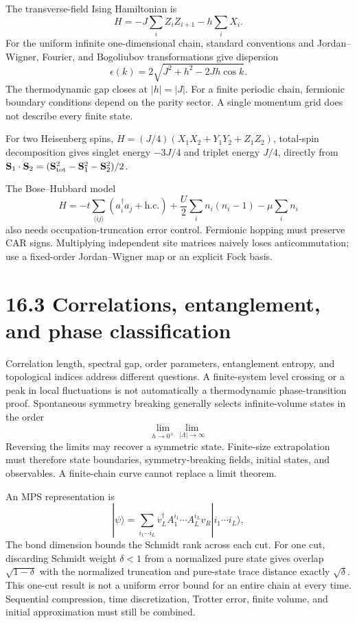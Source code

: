 \documentclass[
  11pt,
  oneside]{book}
\begin{document}
The transverse-field Ising Hamiltonian is \[
H=-J\sum_iZ_iZ_{i+1}-h\sum_iX_i.
\] For the uniform infinite one-dimensional chain, standard conventions
and Jordan--Wigner, Fourier, and Bogoliubov transformations give
dispersion \[
\epsilon(k)=2\sqrt{J^2+h^2-2Jh\cos k}.
\] The thermodynamic gap closes at \(|h|=|J|\). For a finite periodic
chain, fermionic boundary conditions depend on the parity sector. A
single momentum grid does not describe every finite state.

For two Heisenberg spins, \(H=(J/4)(X_1X_2+Y_1Y_2+Z_1Z_2)\), total-spin
decomposition gives singlet energy \(-3J/4\) and triplet energy \(J/4\),
directly from
\(\mathbf S_1\cdot\mathbf S_2=(\mathbf S_{\rm tot}^2-\mathbf S_1^2-\mathbf S_2^2)/2\).

The Bose--Hubbard model \[
H=-t\sum_{\langle ij\rangle}(a_i^\dagger a_j+\mathrm{h.c.})
+\frac U2\sum_i n_i(n_i-1)-\mu\sum_i n_i
\] also needs occupation-truncation error control. Fermionic hopping
must preserve CAR signs. Multiplying independent site matrices naively
loses anticommutation; use a fixed-order Jordan--Wigner map or an
explicit Fock basis.

\section{16.3 Correlations, entanglement, and phase classification}

Correlation length, spectral gap, order parameters, entanglement
entropy, and topological indices address different questions. A
finite-system level crossing or a peak in local fluctuations is not
automatically a thermodynamic phase-transition proof. Spontaneous
symmetry breaking generally selects infinite-volume states in the order
\[
\lim_{h\to0^\pm}\lim_{|\Lambda|\to\infty}
\] Reversing the limits may recover a symmetric state. Finite-size
extrapolation must therefore state boundaries, symmetry-breaking fields,
initial states, and observables. A finite-chain curve cannot replace a
limit theorem.

An MPS representation is \[
|\psi\rangle=\sum_{i_1\cdots i_L}
 v_L^\dagger A_1^{i_1}\cdots A_L^{i_L}v_R
 |i_1\cdots i_L\rangle,
\] The bond dimension bounds the Schmidt rank across each cut. For one
cut, discarding Schmidt weight \(\delta<1\) from a normalized pure state
gives overlap \(\sqrt{1-\delta}\) with the normalized truncation and
pure-state trace distance exactly \(\sqrt\delta\). This one-cut result
is not a uniform error bound for an entire chain at every time.
Sequential compression, time discretization, Trotter error, finite
volume, and initial approximation must still be combined.
\end{document}
